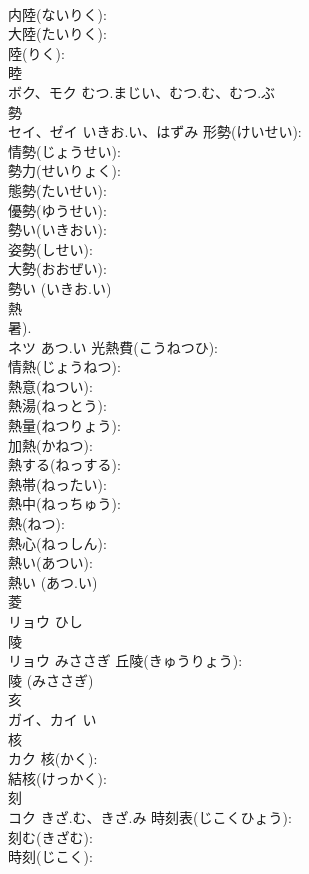 \documentclass[8pt]{extreport}
\begin{document}
\begin{CJK}{UTF8}{min}
\\	内陸(ないりく): 
\\	大陸(たいりく): 
\\	陸(りく): 
\\	睦			
\\	ボク、モク	むつ.まじい、むつ.む、むつ.ぶ		
\\	勢			
\\	セイ、ゼイ	いきお.い、はずみ	形勢(けいせい): 
\\	情勢(じょうせい): 
\\	勢力(せいりょく): 
\\	態勢(たいせい): 
\\	優勢(ゆうせい): 
\\	勢い(いきおい): 
\\	姿勢(しせい): 
\\	大勢(おおぜい): 
\\	勢い (いきお.い)
\\	熱			
\\	暑). 
\\	ネツ	あつ.い	光熱費(こうねつひ): 
\\	情熱(じょうねつ): 
\\	熱意(ねつい): 
\\	熱湯(ねっとう): 
\\	熱量(ねつりょう): 
\\	加熱(かねつ): 
\\	熱する(ねっする): 
\\	熱帯(ねったい): 
\\	熱中(ねっちゅう): 
\\	熱(ねつ): 
\\	熱心(ねっしん): 
\\	熱い(あつい): 
\\	熱い (あつ.い)
\\	菱			
\\	リョウ	ひし		
\\	陵			
\\	リョウ	みささぎ	丘陵(きゅうりょう): 
\\	陵 (みささぎ)
\\	亥			
\\	ガイ、カイ	い		
\\	核			
\\	カク		核(かく): 
\\	結核(けっかく): 
\\	刻			
\\	コク	きざ.む、きざ.み	時刻表(じこくひょう): 
\\	刻む(きざむ): 
\\	時刻(じこく): 

\end{CJK}
\end{document}
